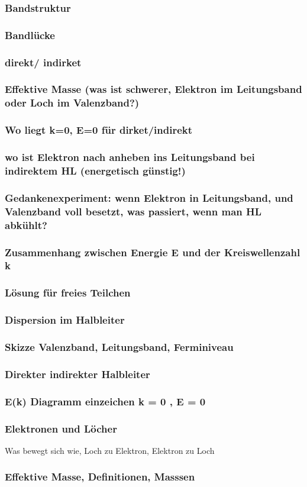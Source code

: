 \subsubsection{Bandstruktur}
\subsubsection{Bandlücke}
\subsubsection{direkt/ indirket}
\subsubsection{Effektive Masse (was ist schwerer, Elektron im Leitungsband oder Loch im Valenzband?)}
\subsubsection{Wo liegt k=0, E=0 für dirket/indirekt}
\subsubsection{wo ist Elektron nach anheben ins Leitungsband bei indirektem HL (energetisch günstig!)}
\subsubsection{Gedankenexperiment: wenn Elektron in Leitungsband, und Valenzband voll besetzt, was passiert, wenn man HL abkühlt?}

\subsubsection{Zusammenhang zwischen Energie E und der Kreiswellenzahl k}
\subsubsection{Lösung für freies Teilchen}
\subsubsection{Dispersion im Halbleiter}

\subsubsection{Skizze Valenzband, Leitungsband, Ferminiveau}
\subsubsection{Direkter indirekter Halbleiter}
\subsubsection{E(k) Diagramm einzeichen k = 0 , E = 0}

\subsubsection{Elektronen und Löcher}
Was bewegt sich wie, Loch zu Elektron, Elektron zu Loch

\subsubsection{Effektive Masse, Definitionen, Masssen}